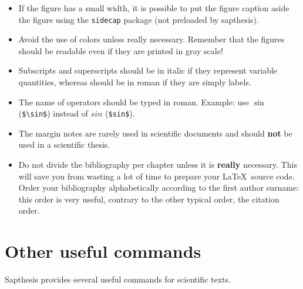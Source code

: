 \documentclass[a5paper,11pt]{article}
\newcommand{\bs}{\textbackslash}
\begin{document}
\begin{itemize}
\item If the figure has a small width, it is possible to put the figure caption
aside the figure using the \texttt{sidecap} package (not preloaded by \textsf{sapthesis}).

\item Avoid the use of colors unless really necessary. Remember that the figures should be readable even if they are printed in gray scale!

\item Subscripts and superscripts should be in italic if they represent variable quantities, whereas should be in roman if they are simply labels.

\item The name of operators should be typed in roman. Example: use $\sin$ (\texttt{\$\bs sin\$}) instead of $sin$ (\texttt{\$sin\$}).

\item The margin notes are rarely used in scientific documents and should \textbf{not} be used in a scientific thesis.

\item Do not divide the bibliography per chapter unless it is \textbf{really} necessary.
This will save you from wasting a lot of time to prepare your \LaTeX\ source code.
Order your bibliography alphabetically according to the
first author surname: this order is very useful, contrary to the other typical order, the citation order.

\end{itemize}

\clearpage
\section{Other useful commands}
\label{sec:usefulcommands}

\textsf{Sapthesis} provides several useful commands for scientific texts.
\end{document}
